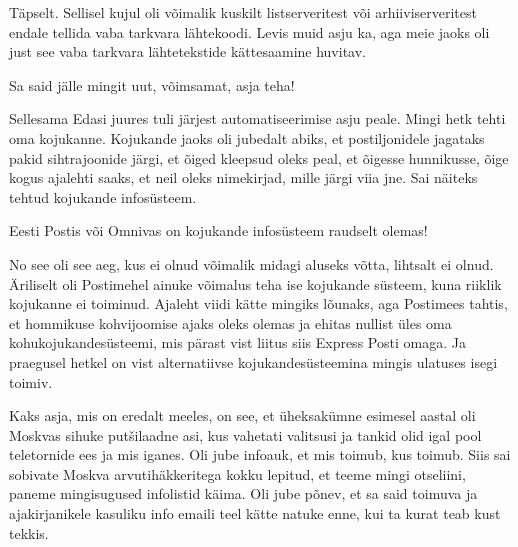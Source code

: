 
Täpselt. Sellisel kujul oli võimalik kuskilt listserveritest või arhiiviserveritest endale tellida vaba tarkvara lähtekoodi. Levis muid asju ka, aga meie jaoks oli just see vaba tarkvara lähtetekstide kättesaamine huvitav.


Sa said jälle mingit  uut, võimsamat, asja teha!

Sellesama Edasi juures tuli järjest  automatiseerimise asju  peale. Mingi hetk tehti oma kojukanne. Kojukande jaoks oli jubedalt abiks, et postiljonidele jagataks pakid sihtrajoonide järgi, et õiged kleepsud oleks peal, et õigesse hunnikusse, õige  kogus ajalehti saaks, et neil oleks nimekirjad, mille  järgi viia jne. Sai näiteks tehtud kojukande infosüsteem. 


Eesti Postis või Omnivas on kojukande infosüsteem raudselt olemas!


No see oli see aeg, kus ei olnud võimalik midagi aluseks võtta, lihtsalt ei olnud.  Äriliselt oli Postimehel  ainuke võimalus teha ise kojukande süsteem, kuna riiklik kojukanne ei toiminud. Ajaleht viidi kätte mingiks lõunaks, aga Postimees tahtis, et hommikuse kohvijoomise ajaks oleks olemas ja ehitas nullist üles oma kohukojukandesüsteemi, mis pärast vist liitus siis Express Posti omaga. Ja praegusel hetkel on vist alternatiivse kojukandesüsteemina  mingis ulatuses isegi toimiv.


Kaks asja, mis on eredalt meeles, on see, et üheksakümne esimesel aastal oli Moskvas sihuke putšilaadne asi, kus vahetati valitsusi ja tankid olid igal pool teletornide ees ja mis iganes. Oli jube infoauk, et mis toimub, kus toimub. Siis sai sobivate Moskva arvutihäkkeritega  kokku lepitud, et teeme mingi otseliini, paneme mingisugused infolistid käima. Oli jube põnev, et sa said toimuva ja ajakirjanikele kasuliku info   emaili teel kätte natuke enne, kui ta kurat teab kust tekkis. 

